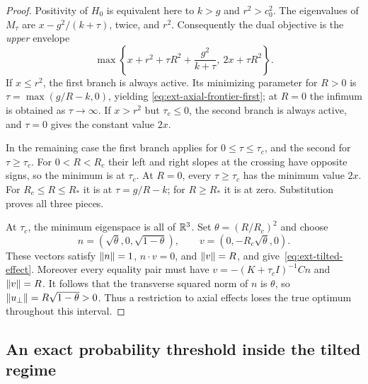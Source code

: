 \begin{proof}
Positivity of $H_0$ is equivalent here to $k>g$ and $r^2>c_0^2$.
The eigenvalues of $M_\tau$ are
$x-g^2/(k+\tau)$, twice, and $r^2$.
Consequently the dual objective is the \emph{upper} envelope
\begin{equation}
 \max\left\{
 x+r^2+\tau R^2+\frac{g^2}{k+\tau},\
 2x+\tau R^2
 \right\}.
 \label{eq:ext-axial-dual-envelope}
\end{equation}
If $x\le r^2$, the first branch is always active. Its minimizing
parameter for $R>0$ is $\tau=\max(g/R-k,0)$, yielding
\eqref{eq:ext-axial-frontier-first}; at $R=0$ the infimum is
obtained as $\tau\to\infty$.
If $x>r^2$ but $\tau_c\le0$, the second branch is always active,
and $\tau=0$ gives the constant value $2x$.

In the remaining case the first branch applies for
$0\le\tau\le\tau_c$, and the second for $\tau\ge\tau_c$.
For $0<R<R_c$ their left and right slopes at the crossing have
opposite signs, so the minimum is at $\tau_c$.
At $R=0$, every $\tau\ge\tau_c$ has the minimum value $2x$.
For $R_c\le R\le R_*$ it is at $\tau=g/R-k$;
for $R\ge R_*$ it is at zero. Substitution proves all three pieces.

At $\tau_c$, the minimum eigenspace is all of $\mathbb R^3$.
Set $\theta=(R/R_c)^2$ and choose
\[
 n=(\sqrt\theta,0,\sqrt{1-\theta}),\qquad
 v=(0,-R_c\sqrt\theta,0).
\]
These vectors satisfy $\left\lVert n\right\rVert=1$, $n\cdot v=0$, and $\left\lVert v\right\rVert=R$,
and give~\eqref{eq:ext-tilted-effect}.
Moreover every equality pair must have
$v=-(K+\tau_cI)^{-1}Cn$ and $\left\lVert v\right\rVert=R$.
It follows that the transverse squared norm of $n$ is $\theta$,
so $\left\lVert u_\perp\right\rVert=R\sqrt{1-\theta}>0$.
Thus a restriction to axial effects loses the true optimum throughout
this interval.
\end{proof}

\subsection{An exact probability threshold inside the tilted regime}

